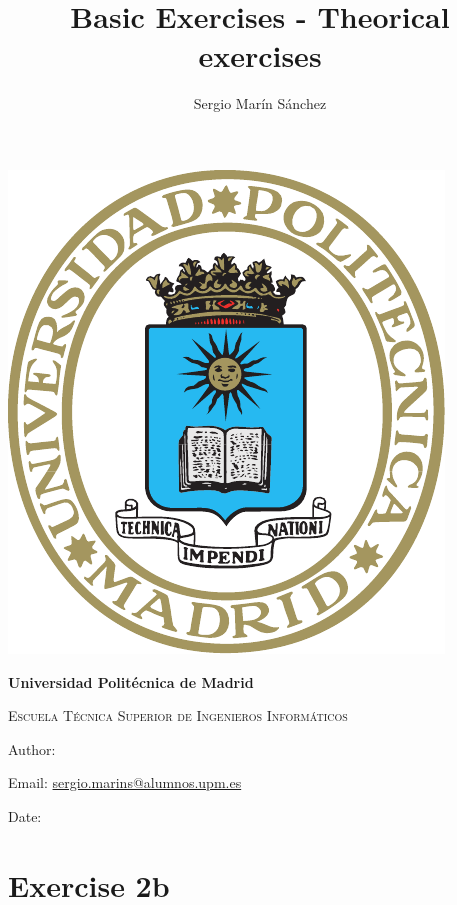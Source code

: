 \documentclass[12pt]{article}
\title{ Basic Exercises - Theorical exercises %
}
\author{ Sergio Marín Sánchez %
}
\begin{document}
\begin{titlepage}
    \centering
    \phantom{a}
    \vspace{2cm}
    {\includegraphics[scale=0.9]{ESCUDO_UPM.pdf}\par}
    \vspace{2cm}
    {\bfseries\LARGE Universidad Politécnica de Madrid \par}
    \vspace{1cm}
    {\scshape\Large Escuela Técnica Superior de Ingenieros Informáticos \par}
    \vspace{1cm}
    {\scshape\Huge \thetitle \par}
    \vfill
    {\large Author: \theauthor \par}
    {\large Email: \href{mailto:sergio.marins@alumnos.upm.es}{sergio.marins@alumnos.upm.es} \par } %
    \vspace{0.2cm}
    {\large Date:  \par}
\end{titlepage}

\thispagestyle{empty}
\tableofcontents
\clearpage

\setcounter{page}{1}

\section{Exercise 2b}
\end{document}
